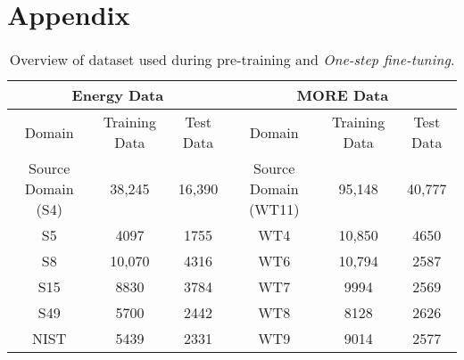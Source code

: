\documentclass[letterpaper]{article} %
\begin{document}
\section{Appendix}
\begin{table*}[t!]
\caption{Overview of dataset used during pre-training and \emph{One-step fine-tuning}.}
\centering
\label{tab:dataset}
\begin{tabular}{|ccc|ccc|}
\hline
\multicolumn{3}{|c|}{Energy Data} & \multicolumn{3}{c|}{MORE Data} \\ \hline
\multicolumn{1}{|c|}{Domain} & \multicolumn{1}{c|}{Training Data} & Test Data & \multicolumn{1}{c|}{Domain} & \multicolumn{1}{c|}{Training Data} & Test Data \\ \hline
\multicolumn{1}{|c|}{Source Domain (S4)} & \multicolumn{1}{c|}{38,245} & 16,390 & \multicolumn{1}{c|}{Source Domain (WT11)} & \multicolumn{1}{c|}{95,148} & 40,777 \\ \hline
\multicolumn{1}{|c|}{S5} & \multicolumn{1}{c|}{4097} & 1755 & \multicolumn{1}{c|}{WT4} & \multicolumn{1}{c|}{10,850} & 4650 \\ \hline
\multicolumn{1}{|c|}{S8} & \multicolumn{1}{c|}{10,070} & 4316 & \multicolumn{1}{c|}{WT6} & \multicolumn{1}{c|}{10,794} & 2587 \\ \hline
\multicolumn{1}{|c|}{S15} & \multicolumn{1}{c|}{8830} & 3784 & \multicolumn{1}{c|}{WT7} & \multicolumn{1}{c|}{9994} & 2569 \\ \hline
\multicolumn{1}{|c|}{S49} & \multicolumn{1}{c|}{5700} & 2442 & \multicolumn{1}{c|}{WT8} & \multicolumn{1}{c|}{8128} & 2626 \\ \hline
\multicolumn{1}{|c|}{NIST} & \multicolumn{1}{c|}{5439} & 2331 & \multicolumn{1}{c|}{WT9} & \multicolumn{1}{c|}{9014} & 2577 \\ \hline
\end{tabular}
\end{table*}
\end{document}
